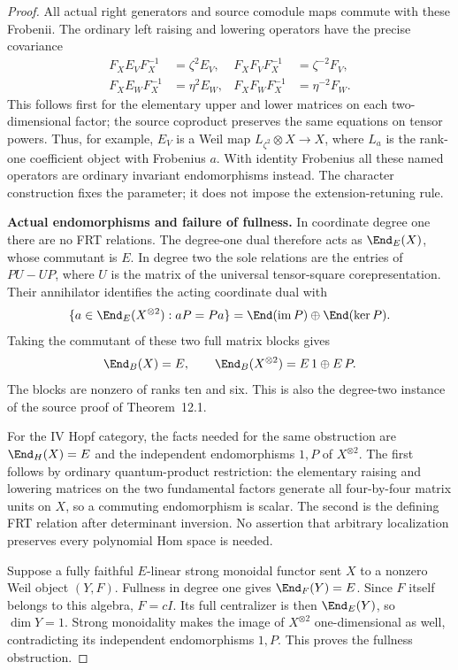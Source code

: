 \documentclass[11pt,a4paper]{article}
\theoremstyle{named}\newtheorem{finding}{Finding}[section]
\theoremstyle{definition}\newtheorem{definition}[finding]{Definition}
\theoremstyle{remark}\newtheorem{remark}[finding]{Remark}
\begin{document}
\begin{proof}
All actual right generators and source comodule maps
commute with these Frobenii. The ordinary left raising
and lowering operators have the precise covariance
\[
\begin{aligned}
 F_XE_VF_X^{-1}&=\zeta^2E_V,&
 F_XF_VF_X^{-1}&=\zeta^{-2}F_V,\\
 F_XE_WF_X^{-1}&=\eta^2E_W,&
 F_XF_WF_X^{-1}&=\eta^{-2}F_W.
\end{aligned}
\]
This follows first for the elementary upper and lower
matrices on each two-dimensional factor; the source
coproduct preserves the same equations on tensor powers.
Thus, for example, $E_V$ is a Weil map
$L_{\zeta^2}\otimes X\to X$, where $L_a$ is the rank-one
coefficient object with Frobenius $a$.
With identity Frobenius all these named operators are
ordinary invariant endomorphisms instead.
The character construction fixes the parameter; it does
not impose the extension-retuning rule.

\par\smallskip\noindent\textbf{Actual endomorphisms and failure of fullness.}\quad
In coordinate degree one there are no FRT relations.
The degree-one dual therefore acts as $\End_E(X)$,
whose commutant is $E$. In degree two the sole relations
are the entries of $PU-UP$, where $U$ is the matrix
of the universal tensor-square corepresentation.
Their annihilator identifies the acting coordinate dual
with
\[
 \{a\in\End_E(X^{\otimes2}):aP=Pa\}
   =\End(\operatorname{im}P)\oplus\End(\ker P).
\]
Taking the commutant of these two full matrix blocks gives
\[
 \End_B(X)=E,\qquad
 \End_B(X^{\otimes2})=E\,1\oplus E\,P.
\]
The blocks are nonzero of ranks ten and six.
This is also the degree-two instance of the source
proof of Theorem~12.1.

For the IV Hopf category, the facts needed for the same
obstruction are $\End_H(X)=E$ and the independent
endomorphisms $1,P$ of $X^{\otimes2}$.
The first follows by ordinary quantum-product restriction:
the elementary raising and lowering matrices on the two
fundamental factors generate all four-by-four matrix
units on $X$, so a commuting endomorphism is scalar.
The second is the defining FRT relation after determinant
inversion. No assertion that arbitrary localization
preserves every polynomial Hom space is needed.

Suppose a fully faithful $E$-linear strong monoidal
functor sent $X$ to a nonzero Weil object $(Y,F)$.
Fullness in degree one gives $\End_F(Y)=E$.
Since $F$ itself belongs to this algebra, $F=cI$.
Its full centralizer is then $\End_E(Y)$, so $\dim Y=1$.
Strong monoidality makes the image of $X^{\otimes2}$
one-dimensional as well, contradicting its independent
endomorphisms $1,P$. This proves the fullness obstruction.


\end{proof}
\end{document}
